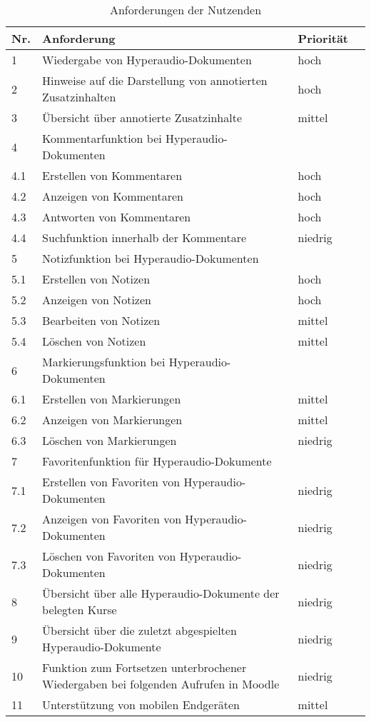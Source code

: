 \begin{table}[!ht]
\def\arraystretch{1.4}
\caption{Anforderungen der Nutzenden}
\label{tab:AnforderungenNutzenden}
\begin{tabularx}{\textwidth}{lXll}      
    \hline
    Nr. & Anforderung & Priorität
    \\\hline
    1 & Wiedergabe von Hyperaudio-Dokumenten & hoch\\
    2 & Hinweise auf die Darstellung von annotierten Zusatzinhalten & hoch\\
    3 & Übersicht über annotierte Zusatzinhalte & mittel\\
    4 & Kommentarfunktion bei Hyperaudio-Dokumenten & \\
    4.1 & Erstellen von Kommentaren & hoch\\
    4.2 & Anzeigen von Kommentaren & hoch\\
    4.3 & Antworten von Kommentaren & hoch\\
    4.4 & Suchfunktion innerhalb der Kommentare & niedrig\\ 
    5 & Notizfunktion bei Hyperaudio-Dokumenten & \\
    5.1 & Erstellen von Notizen & hoch\\
    5.2 & Anzeigen von Notizen & hoch\\
    5.3 & Bearbeiten von Notizen & mittel\\
   	5.4 & Löschen von Notizen & mittel\\
    6 & Markierungsfunktion bei Hyperaudio-Dokumenten & \\
    6.1 & Erstellen von Markierungen & mittel\\
    6.2 & Anzeigen von Markierungen & mittel\\
   	6.3 & Löschen von Markierungen & niedrig\\
    7 & Favoritenfunktion für Hyperaudio-Dokumente & \\
    7.1 & Erstellen von Favoriten von Hyperaudio-Dokumenten & niedrig\\
    7.2 & Anzeigen von Favoriten von Hyperaudio-Dokumenten & niedrig\\
    7.3 & Löschen von Favoriten von Hyperaudio-Dokumenten & niedrig\\    
    8 & Übersicht über alle Hyperaudio-Dokumente der belegten Kurse & niedrig\\
    9 & Übersicht über die zuletzt abgespielten Hyperaudio-Dokumente & niedrig\\
    10 &  Funktion zum Fortsetzen unterbrochener Wiedergaben bei folgenden Aufrufen in Moodle & niedrig\\
    11 & Unterstützung von mobilen Endgeräten & mittel\\
    \hline
\end{tabularx}
\end{table}



